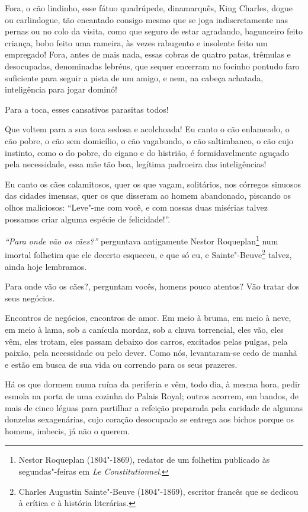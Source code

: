 Fora, o cão lindinho, esse fátuo quadrúpede, dinamarquês, King
Charles, dogue ou carlindogue, tão encantado consigo mesmo que se
joga indiscretamente nas pernas ou no colo da visita, como que seguro de estar agradando, bagunceiro feito criança, bobo feito uma
rameira, às vezes rabugento e insolente feito um empregado! Fora,
antes de mais nada, essas cobras de quatro patas, trêmulas e desocupadas,
denominadas lebréus, que sequer encerram no focinho pontudo faro
suficiente para seguir a pista de um amigo, e nem, na cabeça
achatada, inteligência para jogar dominó!

Para a toca, esses cansativos parasitas todos!

Que voltem para a sua toca sedosa e acolchoada! Eu canto o cão enlameado,
o cão pobre, o cão sem domicílio, o cão vagabundo, o cão saltimbanco, o
cão cujo instinto, como o do pobre, do cigano e do histrião, é
formidavelmente aguçado pela necessidade, essa mãe tão boa, 
legítima padroeira das inteligências!

Eu canto os cães calamitosos, quer os que vagam, solitários, nos
córregos sinuosos das cidades imensas, quer os que disseram ao
homem abandonado, piscando os olhos maliciosos:
“Leve"-me com você, e com nossas duas misérias talvez
possamos criar alguma espécie de felicidade!''.

\textit{“Para onde vão os cães?''} perguntava antigamente
Nestor Roqueplan\footnote{ Nestor Roqueplan (1804"-1869), 
redator de um folhetim publicado às
segundas"-feiras em \textit{Le Constitutionnel}.}
 num imortal folhetim que ele decerto esqueceu, e que 
só eu, e Sainte"-Beuve\footnote{Charles Augustin 
Sainte"-Beuve (1804"-1869), escritor francês que
se dedicou à crítica e à história literárias.}
talvez, ainda hoje lembramos.

Para onde vão os cães?, perguntam vocês, homens pouco atentos? Vão tratar dos seus negócios.

Encontros de negócios, encontros de amor. Em meio à bruma, em meio à
neve, em meio à lama, sob a canícula mordaz, sob a chuva torrencial,
eles vão, eles vêm, eles trotam, eles passam debaixo dos carros, excitados
pelas pulgas, pela paixão, pela necessidade ou pelo dever. Como
nós,
levantaram-se cedo de manhã e estão em busca de sua vida ou correndo para os
seus prazeres.

Há os que dormem numa ruína da periferia e vêm, todo dia, à mesma
hora, pedir esmola na porta de uma cozinha do Palais Royal;
outros acorrem, em bandos, de mais de cinco léguas para
partilhar a refeição preparada pela caridade de algumas donzelas
sexagenárias, cujo coração desocupado se entrega aos bichos porque
os homens, imbecis, já não o querem.

